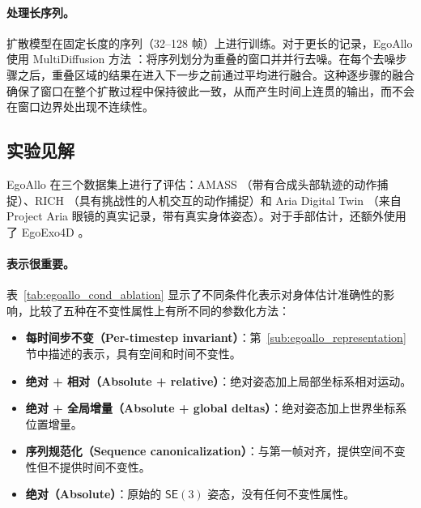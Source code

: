 \documentclass[../../book-main_zh.tex]{subfiles}
\begin{document}
\paragraph{处理长序列。}
扩散模型在固定长度的序列（32--128 帧）上进行训练。对于更长的记录，EgoAllo 使用 MultiDiffusion 方法 \citep{bar2023multidiffusion}：将序列划分为重叠的窗口并并行去噪。在每个去噪步骤之后，重叠区域的结果在进入下一步之前通过平均进行融合。这种逐步骤的融合确保了窗口在整个扩散过程中保持彼此一致，从而产生时间上连贯的输出，而不会在窗口边界处出现不连续性。

\subsection{实验见解}
\label{sub:egoallo_experiments}

EgoAllo 在三个数据集上进行了评估：AMASS
\citep{mahmood2019amass}（带有合成头部轨迹的动作捕捉）、RICH \citep{huang2022rich}（具有挑战性的人机交互的动作捕捉）和 Aria Digital Twin
\citep{pan2023aria}（来自 Project Aria 眼镜的真实记录，带有真实身体姿态）。对于手部估计，还额外使用了 EgoExo4D
\citep{grauman2023egoexo4d}。

\paragraph{表示很重要。}
表~\ref{tab:egoallo_cond_ablation} 显示了不同条件化表示对身体估计准确性的影响，比较了五种在不变性属性上有所不同的参数化方法：
\begin{itemize}
    \item \textbf{每时间步不变（Per-timestep invariant）}：第~\ref{sub:egoallo_representation} 节中描述的表示，具有空间和时间不变性。
    \item \textbf{绝对 + 相对（Absolute + relative）}：绝对姿态加上局部坐标系相对运动。
    \item \textbf{绝对 + 全局增量（Absolute + global deltas）}：绝对姿态加上世界坐标系位置增量。
    \item \textbf{序列规范化（Sequence canonicalization）}：与第一帧对齐，提供空间不变性但不提供时间不变性。
    \item \textbf{绝对（Absolute）}：原始的 $\mathsf{SE}(3)$ 姿态，没有任何不变性属性。
\end{itemize}
\end{document}
